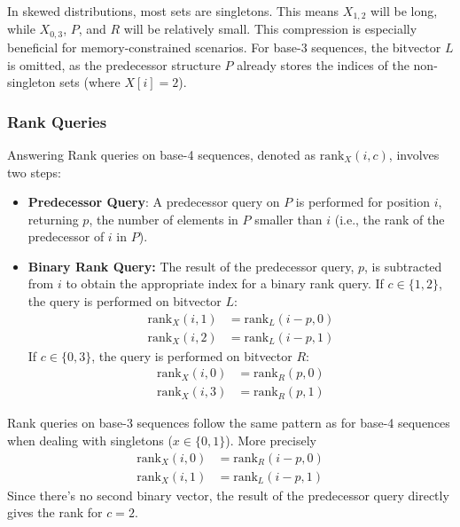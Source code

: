 \noindent In skewed distributions, most sets are singletons. This means \(X_{1,2}\) will be long, while \(X_{0,3}\), $P$, and $R$ will be relatively small. This compression is especially beneficial for memory-constrained scenarios. For base-3 sequences, the bitvector \(L\) is omitted, as the predecessor structure \(P\) already stores the indices of the non-singleton sets (where \(X[i] = 2\)).

\subsubsection*{Rank Queries}

Answering Rank queries on base-4 sequences, denoted as \(\textrm{rank}_X(i, c)\), involves two steps:

\begin{itemize}
    \item \textbf{Predecessor Query}: A predecessor query on \(P\) is performed for position \(i\), returning \(p\), the number of elements in \(P\) smaller than \(i\) (i.e., the rank of the predecessor of \(i\) in \(P\)).

    \item \textbf{Binary Rank Query:}  The result of the predecessor query, \(p\), is subtracted from \(i\) to obtain the appropriate index for a binary rank query. If \(c \in \{1, 2\}\), the query is performed on bitvector \(L\):
          \begin{align}
              \textrm{rank}_X(i, 1) & = \textrm{rank}_L(i-p, 0) \\
              \textrm{rank}_X(i, 2) & = \textrm{rank}_L(i-p, 1)
          \end{align}
          If \(c \in \{0, 3\}\), the query is performed on bitvector \(R\):
          \begin{align}
              \textrm{rank}_X(i, 0) & = \textrm{rank}_R(p, 0) \\
              \textrm{rank}_X(i, 3) & = \textrm{rank}_R(p, 1)
          \end{align}
\end{itemize}

\noindent Rank queries on base-3 sequences follow the same pattern as for base-4 sequences when dealing with singletons (\(x \in \{0,1\}\)). More precisely
\begin{align}
    \textrm{rank}_X(i, 0) & = \textrm{rank}_R(i-p, 0) \\
    \textrm{rank}_X(i, 1) & = \textrm{rank}_L(i-p, 1)
\end{align}
\noindent Since there's no second binary vector, the result of the predecessor query directly gives the rank for \(c=2\). \vspace{0.4cm}

